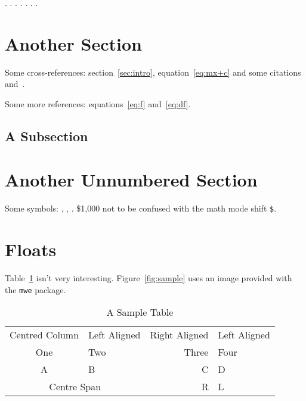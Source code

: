 \documentclass{article}
\begin{document}
.
.
.
.
.
.
.

\section{Another Section}

Some cross-references: section~\ref{sec:intro},
equation~\ref{eq:mx+c} and some
citations~\cite{article-full,incollection-full}
and~\cite[some text]{inproceedings-full}.

Some more references: equations~\ref{eq:f} and~\ref{eq:df}.

\lipsum[2-3]

\subsection{A Subsection}

\lipsum[6-7]

\section*{Another Unnumbered Section}

Some symbols: , , . \$1,000 not to be
confused with the math mode shift \verb|$|.

\lipsum[8-9]

\section{Floats}
\label{sec:floats}

Table~\ref{tab:sample} isn't very interesting.
Figure~\ref{fig:sample} uses an image provided with the 
\texttt{mwe} package.

\begin{table}[htbp]
\caption{A Sample Table}
\label{tab:sample}
\centering
\begin{tabular}{clrl}
Centred Column & Left Aligned & Right Aligned & Left Aligned\\
One & Two & Three & Four\\
A & B & C & D\\
\multicolumn{2}{|c|}{Centre Span} & R & L
\end{tabular}
\end{table}
\end{document}

